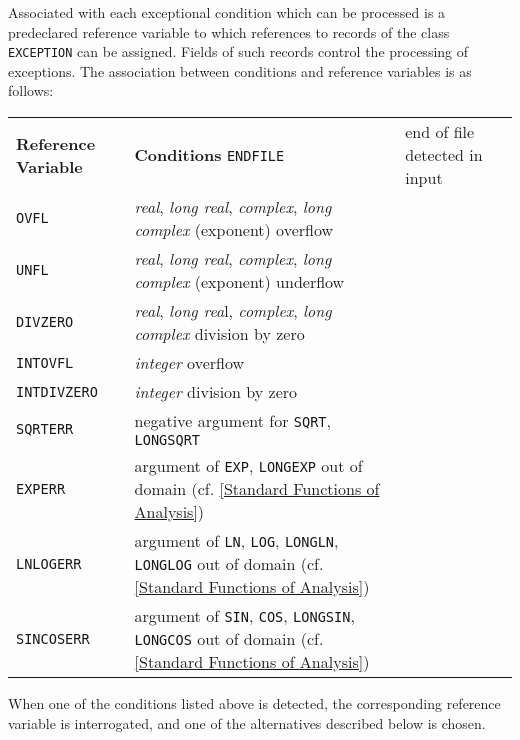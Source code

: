 \documentclass[a4paper]{article}
\def\A{\lstinline[language=AlgolW,style=ReferenceManual]}
\def\T#1{\textit{#1}}
\begin{document}
Associated with each exceptional condition which can be processed is a
predeclared reference variable to which references to records of the
class \A!EXCEPTION! can be assigned. Fields of such records control
the processing of exceptions. The association between conditions and
reference variables is as follows:

\begin{longtable}{lp{3.5in}}
\textbf{Reference Variable} &  \textbf{Conditions} \endhead
\A!ENDFILE!     &  end of file detected in input \\
\A!OVFL!        &  \T{real}, \T{long real}, \T{complex}, \T{long complex} (exponent) overflow \\
\A!UNFL!        &  \T{real}, \T{long real}, \T{complex}, \T{long complex} (exponent) underflow \\
\A!DIVZERO!     &  \T{real}, \T{long rea}l, \T{complex}, \T{long complex} division by zero \\
\A!INTOVFL!     &  \T{integer} overflow \\
\A!INTDIVZERO!  &  \T{integer} division by zero \\
\A!SQRTERR!     &  negative argument for \A!SQRT!, \A!LONGSQRT! \\
\A!EXPERR!      &  argument of \A!EXP!, \A!LONGEXP! out of domain (cf. \ref{Standard Functions of Analysis}) \\
\A!LNLOGERR!    &  argument of \A!LN!, \A!LOG!, \A!LONGLN!, \A!LONGLOG! out of domain (cf. \ref{Standard Functions of Analysis}) \\
\A!SINCOSERR!   &  argument of \A!SIN!, \A!COS!, \A!LONGSIN!, \A!LONGCOS! out of domain (cf. \ref{Standard Functions of Analysis})
\end{longtable}

When one of the conditions listed above is detected, the corresponding
reference variable is interrogated, and one of the alternatives
described below is chosen.
\end{document}
